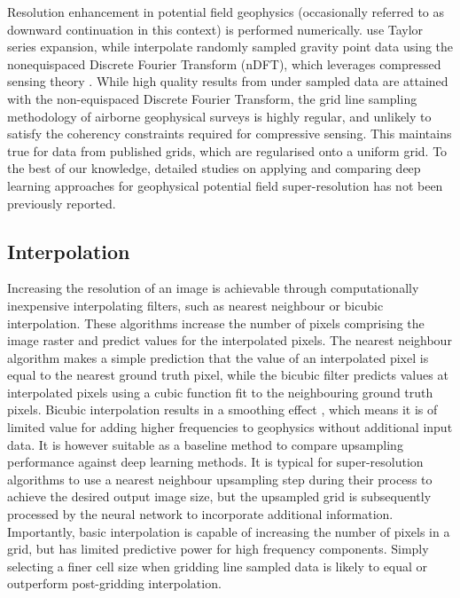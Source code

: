 Resolution enhancement in potential field geophysics (occasionally referred to as downward continuation in this context) is performed numerically.
\Textcite{chenPotentialFieldData2022} use Taylor series expansion, while \textcite{xuGravityAnomalyReconstruction2019} interpolate randomly sampled gravity point data using the nonequispaced Discrete Fourier Transform (nDFT), which leverages compressed sensing theory \parencite{candesIntroductionCompressiveSampling2008}.
While high quality results from under sampled data are attained with the non-equispaced Discrete Fourier Transform, the grid line sampling methodology of airborne geophysical surveys is highly regular, and unlikely to satisfy the coherency constraints required for compressive sensing.
This maintains true for data from published grids, which are regularised onto a uniform grid.
To the best of our knowledge, detailed studies on applying and comparing deep learning approaches for geophysical potential field super-resolution has not been previously reported.

\subsection{Interpolation}
Increasing the resolution of an image is achievable through computationally inexpensive interpolating filters, such as nearest neighbour or bicubic interpolation.
These algorithms increase the number of pixels comprising the image raster and predict values for the interpolated pixels.
The nearest neighbour algorithm makes a simple prediction that the value of an interpolated pixel is equal to the nearest ground truth pixel, while the bicubic filter predicts values at interpolated pixels using a cubic function fit to the neighbouring ground truth pixels.
Bicubic interpolation results in a smoothing effect \parencite{keysCubicConvolutionInterpolation1981}, which means it is of limited value for adding higher frequencies to geophysics without additional input data.
It is however suitable as a baseline method to compare upsampling performance against deep learning methods.
It is typical for super-resolution algorithms to use a nearest neighbour upsampling step during their process to achieve the desired output image size, but the upsampled grid is subsequently processed by the neural network to incorporate additional information.
Importantly, basic interpolation is capable of increasing the number of pixels in a grid, but has limited predictive power for high frequency components.
Simply selecting a finer cell size when gridding line sampled data is likely to equal or outperform post-gridding interpolation.

